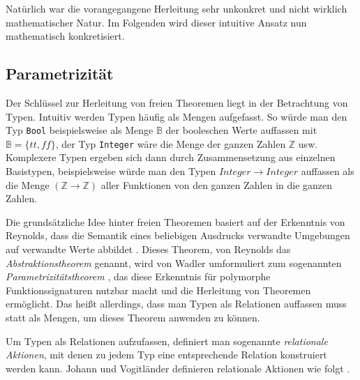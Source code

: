 Natürlich war die vorangegangene Herleitung sehr unkonkret und nicht wirklich mathematischer Natur. Im Folgenden wird dieser
intuitive Ansatz nun mathematisch konkretisiert.


\subsection{Parametrizität}

\label{sec:free-theorems-param}

Der Schlüssel zur Herleitung von freien Theoremen liegt in der Betrachtung von Typen.
Intuitiv werden Typen häufig als Mengen aufgefasst. So würde man den Typ \texttt{Bool} beispielsweise als Menge $\mathbb{B}$
der booleschen Werte auffassen mit $\mathbb{B} = \{ tt, ff \}$, der Typ \texttt{Integer} wäre die Menge der ganzen Zahlen
$\mathbb{Z}$ usw. Komplexere Typen ergeben sich dann durch Zusammensetzung aus einzelnen Basistypen, beispielsweise
würde man den Typen \texttt{$Integer \rightarrow Integer$} auffassen als die Menge $(\mathbb{Z} \rightarrow \mathbb{Z})$ aller Funktionen von den ganzen Zahlen in die ganzen Zahlen.

Die grundsätzliche Idee hinter freien Theoremen basiert auf der Erkenntnis von Reynolds, dass die Semantik eines beliebigen
Ausdrucks verwandte Umgebungen auf verwandte Werte abbildet \cite{reynolds}. Dieses Theorem, von Reynolds das
\textit{Abstraktionstheorem} genannt, wird von Wadler umformuliert zum sogenannten \textit{Parametrizitätstheorem} \cite{wadler},
das diese Erkenntnis für polymorphe Funktionssignaturen nutzbar macht und die Herleitung von Theoremen ermöglicht.
Das heißt allerdings, dass man Typen als Relationen auffassen muss statt als Mengen, um dieses Theorem anwenden zu können.

Um Typen als Relationen aufzufassen, definiert man sogenannte \textit{relationale Aktionen}, mit denen zu jedem Typ eine entsprechende Relation
konstruiert werden kann. Johann und Vogitländer definieren relationale Aktionen wie folgt \cite{johann2006}.

